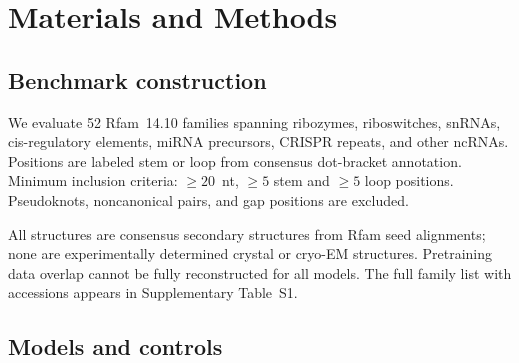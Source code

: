 \documentclass[11pt]{article}
\begin{document}
\section{Materials and Methods}
\label{sec:methods}

\subsection{Benchmark construction}
\label{sec:benchmark}

We evaluate 52 Rfam~14.10 families \citep{kalvari2021rfam} spanning ribozymes, riboswitches, snRNAs,
cis-regulatory elements, miRNA precursors, CRISPR repeats, and other ncRNAs.
Positions are labeled stem or loop from consensus dot-bracket annotation.
Minimum inclusion criteria: $\geq 20$~nt, $\geq 5$ stem and $\geq 5$ loop
positions. Pseudoknots, noncanonical pairs, and gap positions are excluded.

All structures are consensus secondary structures from Rfam seed alignments;
none are experimentally determined crystal or cryo-EM structures. Pretraining
data overlap cannot be fully reconstructed for all models. The full family
list with accessions appears in Supplementary Table~S1.

\subsection{Models and controls}
\label{sec:models}
\end{document}

